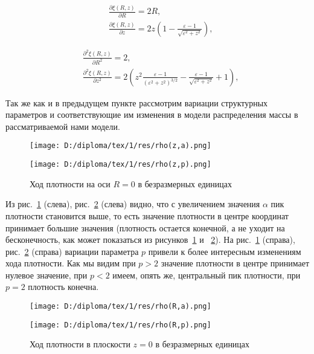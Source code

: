   \begin{equation}
 \begin{split}  
&\frac{\partial \xi(R,z)}{\partial R} =  2R,\\
&\frac{\partial \xi(R,z)}{\partial z} = 2z \left( 1 - \frac{\varepsilon - 1}{\sqrt{\varepsilon^2 + z^2}} \right),
 \end{split}
 \end{equation}
 
  \begin{equation}
 \begin{split}  
&\frac{ \partial^2\xi(R,z) }{\partial R^2} = 2,\\
&\frac{ \partial^2\xi(R,z) }{\partial z^2} = 2\left( 
z^2 \frac{\varepsilon - 1}{(\varepsilon^2 + z^2)^{3/2}} - \frac{\varepsilon - 1}{\sqrt{\varepsilon^2 + z^2}}  +1 
\right),
 \end{split}
 \end{equation}

Так же как и в предыдущем пункте рассмотрим вариации структурных параметров и соответствующие им изменения в модели распределения массы в рассматриваемой нами модели.
\begin{figure}[H]
\centering
\begin{minipage}[t]{0.49\textwidth}
\centering
\texttt{[image: D:/diploma/tex/1/res/rho(z,a).png]}
\end{minipage}
\hfill
\begin{minipage}[b]{0.49\linewidth}
\centering \texttt{[image: D:/diploma/tex/1/res/rho(z,p).png]}
\end{minipage}
\caption{Ход плотности на оси $R=0$ в безразмерных единицах}\label{rho:z}
\end{figure}
{\flushleft Из рис.~\ref{rho:z} (слева), рис.~\ref{rho:R} (слева) видно, что с увеличением значения $\alpha$ пик плотности становится выше, то есть значение плотности в центре координат принимает большие значения (плотность остается конечной, а не уходит на бесконечность, как может показаться из рисунков~\ref{rho:z} и ~\ref{rho:R}). На рис.~\ref{rho:z} (справа), рис.~\ref{rho:R} (справа) вариации параметра $p$ привели к более интересным изменениям хода плотности. Как мы видим при $p>2$ значение плотности в центре принимает нулевое значение, при $p<2$ имеем, опять же, центральный пик плотности, при $p=2$ плотность конечна.}
{
\begin{figure}[H]
\centering
\begin{minipage}[t]{0.49\textwidth}
\centering
\texttt{[image: D:/diploma/tex/1/res/rho(R,a).png]}
\end{minipage}
\hfill
\begin{minipage}[b]{0.49\linewidth}
\centering \texttt{[image: D:/diploma/tex/1/res/rho(R,p).png]}
\end{minipage}
\caption{Ход плотности в плоскости $z=0$ в безразмерных единицах}\label{rho:R}
\end{figure}
}


